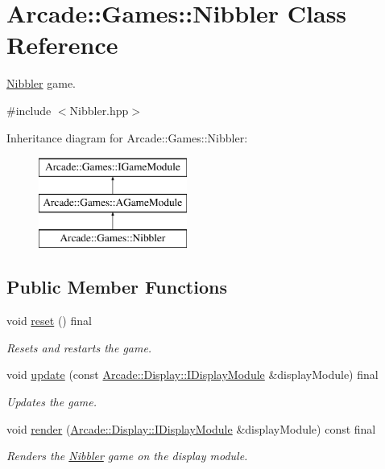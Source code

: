 \hypertarget{classArcade_1_1Games_1_1Nibbler}{}\section{Arcade\+::Games\+::Nibbler Class Reference}
\label{classArcade_1_1Games_1_1Nibbler}


\mbox{\hyperlink{classArcade_1_1Games_1_1Nibbler}{Nibbler}} game.  




{\ttfamily \#include $<$Nibbler.\+hpp$>$}

Inheritance diagram for Arcade\+::Games\+::Nibbler\+:\begin{figure}[H]
\begin{center}
\leavevmode
\includegraphics[height=3.000000cm]{classArcade_1_1Games_1_1Nibbler}
\end{center}
\end{figure}
\subsection*{Public Member Functions}
\begin{DoxyCompactItemize}
\item 
\mbox{\label{classArcade_1_1Games_1_1Nibbler_ab07050c302d764a32e42db43664e4687}} 
void \mbox{\hyperlink{classArcade_1_1Games_1_1Nibbler_ab07050c302d764a32e42db43664e4687}{reset}} () final
\begin{DoxyCompactList}\small\item\em Resets and restarts the game. \end{DoxyCompactList}\item 
void \mbox{\hyperlink{classArcade_1_1Games_1_1Nibbler_a6a44a75ab1905647587d7a6314155955}{update}} (const \mbox{\hyperlink{classArcade_1_1Display_1_1IDisplayModule}{Arcade\+::\+Display\+::\+I\+Display\+Module}} \&display\+Module) final
\begin{DoxyCompactList}\small\item\em Updates the game. \end{DoxyCompactList}\item 
void \mbox{\hyperlink{classArcade_1_1Games_1_1Nibbler_afd52ee2fad66523b58f94f9eb582145e}{render}} (\mbox{\hyperlink{classArcade_1_1Display_1_1IDisplayModule}{Arcade\+::\+Display\+::\+I\+Display\+Module}} \&display\+Module) const final
\begin{DoxyCompactList}\small\item\em Renders the \mbox{\hyperlink{classArcade_1_1Games_1_1Nibbler}{Nibbler}} game on the display module. \end{DoxyCompactList}\end{DoxyCompactItemize}
